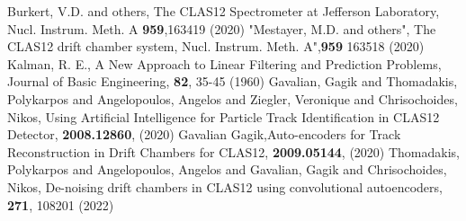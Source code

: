 \documentclass{webofc}
\begin{document}
\begin{thebibliography}{}
%
%
Burkert, V.D. and others, The CLAS12 Spectrometer at Jefferson Laboratory, Nucl. Instrum. Meth. A \textbf{959},163419 (2020)
 "Mestayer, M.D. and others", The CLAS12 drift chamber system, Nucl. Instrum. Meth. A",\textbf{959} 163518 (2020)
  Kalman, R. E., A New Approach to Linear Filtering and Prediction Problems, Journal of Basic Engineering, \textbf{82}, 35-45 (1960)
Gavalian, Gagik and Thomadakis, Polykarpos and Angelopoulos, Angelos and Ziegler, Veronique and Chrisochoides, Nikos, Using Artificial Intelligence for Particle Track Identification in CLAS12 Detector, \textbf{2008.12860}, (2020)
 Gavalian Gagik,Auto-encoders for Track Reconstruction in Drift Chambers for CLAS12, \textbf{2009.05144}, (2020)
   Thomadakis, Polykarpos and Angelopoulos, Angelos and Gavalian, Gagik and Chrisochoides, Nikos, De-noising drift chambers in CLAS12 using convolutional autoencoders, \textbf{271}, 108201 (2022)
\end{thebibliography}
\end{document}
